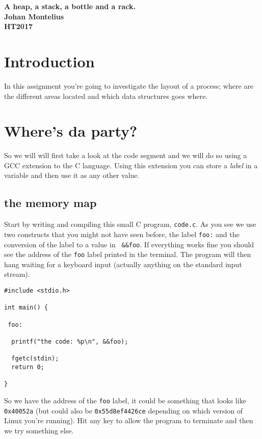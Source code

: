 \documentclass[a4paper,11pt]{article}
\newcommand{\nnsection}[1]{
\section*{#1} \addcontentsline{toc}{section}{#1} }
\begin{document}
\begin{center} \vspace{20pt} \textbf{\large A heap, a stack, a bottle and a rack.}\\
\vspace{10pt} \textbf{Johan Montelius}\\ \vspace{10pt} \textbf{HT2017}
\end{center}

\nnsection{Introduction}

In this assignment you're going to investigate the layout of a process;
where are the different areas located and which data structures goes
where.

\section{Where's da party?}

So we will will first take a look at the code segment and we will do
so using a GCC extension to the C language. Using this extension you
can store a {\em label} in a variable and then use it as any other value.

\subsection{the memory map}

Start by writing and compiling this small C program, {\tt code.c}. As
you see we use two constructs that you might not have seen before, the
label {\tt foo:} and the conversion of the label to a value in {\tt
  \&\&foo}. If everything works fine you should see the address of the
{\tt foo} label printed in the terminal. The program will then hang
waiting for a keyboard input (actually anything on the standard input
stream).


\begin{lstlisting}
#include <stdio.h>

int main() {

 foo:

  printf("the code: %p\n", &&foo);  

  fgetc(stdin);
  return 0;
  
}
\end{lstlisting}

So we have the address of the {\tt foo} label, it could be something
that looks like {\tt 0x40052a} (but could also be {\tt 0x55d8ef4426ce}
depending on which version of Linux you're running). Hit any key to
allow the program to terminate and then we try something else.
\end{document}

